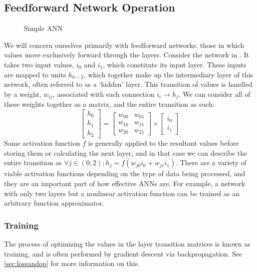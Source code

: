 \subsection{Feedforward Network Operation}
\begin{wrapfigure}[8]{l}{.35\textwidth}
	\centering
	\vspace{-12pt}
	{\scalebox{.9}{}}
	\caption{Simple ANN}
	\label{fig:ANN}
\end{wrapfigure}
We will concern ourselves primarily with feedforward networks: those in which 
values move exclusively forward through the layers.
Consider the network in . It takes two input values, $i_0$ and 
$i_1$, which constitute its input layer. These inputs are mapped to units 
$h_{0-2}$, which together make up the intermediary layer of this network, often 
referred to as a `hidden' layer.  This transition of values is handled by a 
weight, $w_{ij}$, associated with each connection $i_i \rightarrow h_j$. We can 
consider all of these weights together as a matrix, and the entire transition as 
such:
\begin{equation}
	\begin{bmatrix} h_0 \\ h_1 \\ h_2 \end{bmatrix} = \begin{bmatrix}
w_{00} & w_{01}\\ w_{10} & w_{11}\\ w_{20} & w_{21} \end{bmatrix} \times 
\begin{bmatrix} i_0 \\ i_1 \end{bmatrix}
\end{equation}
Some activation function $f$ is generally applied to the resultant values before 
storing them or calculating the next layer, and in that case we can describe the 
entire transition as $\forall j \in (0,2); h_j = f(w_{j0}i_0 + w_{j1}i_1)$.  
There are a variety of viable activation functions depending on the type of data 
being processed, and they are an important part of how effective ANNs are. For 
example, a network with only two layers but a nonlinear activation function can 
be trained as an arbitrary function approximator.\cite{2006mathematics}
\subsubsection{Training}
The process of optimizing the values in the layer transition matrices is known 
as training, and is often performed by gradient descent via 
backpropagation\cite{Rumelhart}. See \ref{sec:lossandop} for more information on 
this.

